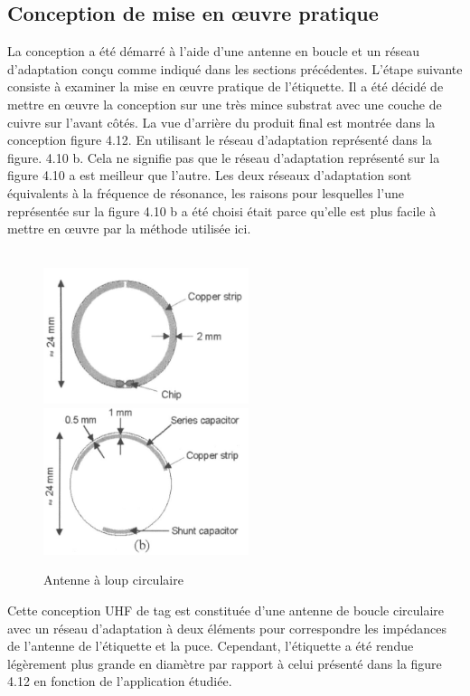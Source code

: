 \documentclass[11pt, a4paper, twoside]{book}
\begin{document}
\subsection{Conception de mise en œuvre pratique}
La conception a été démarré à l'aide d'une antenne en boucle et un réseau d'adaptation conçu comme indiqué dans les sections précédentes. L'étape suivante consiste à examiner la mise en œuvre pratique de l'étiquette. Il a été décidé de mettre en œuvre la conception sur une très mince substrat avec une couche de cuivre sur l'avant côtés. La vue d'arrière du produit final est montrée dans la conception figure 4.12. En utilisant le réseau d'adaptation représenté dans la figure. 4.10 b. Cela ne signifie pas que le réseau d'adaptation représenté sur la figure 4.10 a est meilleur que l'autre. Les deux réseaux d'adaptation sont équivalents à la fréquence de résonance, les raisons pour lesquelles l'une représentée sur la figure 4.10 b a été choisi était parce qu'elle est plus facile à mettre en œuvre par la méthode utilisée ici.\\\\
\begin{figure}[H]
\centering
\includegraphics[width=6cm]{front}
\includegraphics[width=6cm]{back}
\caption{Antenne à loup circulaire}
\end{figure}

Cette conception UHF de tag est constituée d'une antenne de boucle circulaire avec un réseau d'adaptation à deux éléments pour correspondre les impédances de l'antenne de l'étiquette et la puce. Cependant, l'étiquette a été rendue légèrement plus grande en diamètre par rapport à celui présenté dans la figure 4.12 en fonction de l'application étudiée. 
\end{document}
